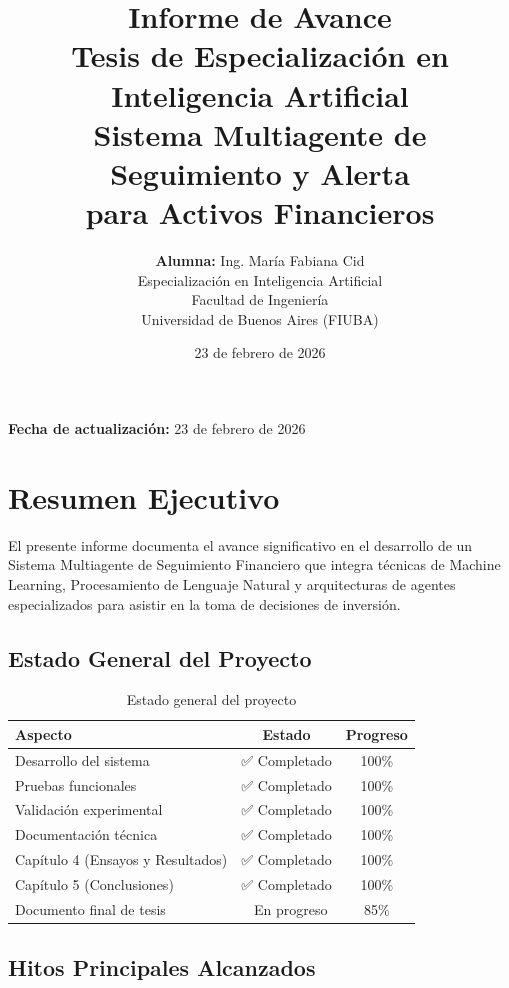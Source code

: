 \documentclass[12pt,a4paper]{article}
\title{
    \vspace{-2cm}
    \textbf{Informe de Avance}\\
    \textbf{Tesis de Especialización en Inteligencia Artificial}\\
    \vspace{0.5cm}
    \large Sistema Multiagente de Seguimiento y Alerta\\
    para Activos Financieros
}
\author{
    \textbf{Alumna:} Ing. María Fabiana Cid\\
    \vspace{0.3cm}
    \small Especialización en Inteligencia Artificial\\
    \small Facultad de Ingeniería\\
    \small Universidad de Buenos Aires (FIUBA)
}
\date{23 de febrero de 2026}
\begin{document}
\maketitle
\thispagestyle{empty}

\vspace{1cm}

\begin{center}
\large
\textbf{Fecha de actualización:} 23 de febrero de 2026
\end{center}

\newpage
\tableofcontents
\newpage

\section{Resumen Ejecutivo}

El presente informe documenta el avance significativo en el desarrollo de un Sistema Multiagente de Seguimiento Financiero que integra técnicas de Machine Learning, Procesamiento de Lenguaje Natural y arquitecturas de agentes especializados para asistir en la toma de decisiones de inversión.

\subsection{Estado General del Proyecto}

\begin{table}[H]
\centering
\begin{tabular}{lcc}
\toprule
\textbf{Aspecto} & \textbf{Estado} & \textbf{Progreso} \\
\midrule
Desarrollo del sistema & ✅ Completado & 100\% \\
Pruebas funcionales & ✅ Completado & 100\% \\
Validación experimental & ✅ Completado & 100\% \\
Documentación técnica & ✅ Completado & 100\% \\
Capítulo 4 (Ensayos y Resultados) & ✅ Completado & 100\% \\
Capítulo 5 (Conclusiones) & ✅ Completado & 100\% \\
Documento final de tesis & 🔄 En progreso & 85\% \\
\bottomrule
\end{tabular}
\caption{Estado general del proyecto}
\end{table}

\subsection{Hitos Principales Alcanzados}
\end{document}
